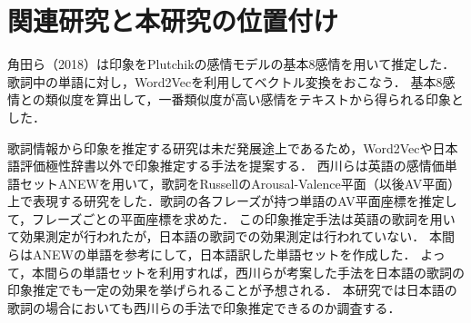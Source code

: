 \documentclass[a4paper,10pt,twocolumn]{jsarticle}
\begin{document}
\section{関連研究と本研究の位置付け}
角田ら（2018）\cite{4}は印象をPlutchikの感情モデルの基本8感情を用いて推定した．歌詞中の単語に対し，Word2Vecを利用してベクトル変換をおこなう．
基本8感情との類似度を算出して，一番類似度が高い感情をテキストから得られる印象とした．

歌詞情報から印象を推定する研究は未だ発展途上であるため，Word2Vecや日本語評価極性辞書以外で印象推定する手法を提案する．
西川ら\cite{3}は英語の感情価単語セットANEW\cite{7}を用いて，歌詞をRussellのArousal-Valence平面\cite{9}（以後AV平面）上で表現する研究をした．歌詞の各フレーズが持つ単語のAV平面座標を推定して，フレーズごとの平面座標を求めた．
この印象推定手法は英語の歌詞を用いて効果測定が行われたが，日本語の歌詞での効果測定は行われていない．
本間ら\cite{8}はANEWの単語を参考にして，日本語訳した単語セットを作成した．
よって，本間らの単語セットを利用すれば，西川らが考案した手法を日本語の歌詞の印象推定でも一定の効果を挙げられることが予想される．
本研究では日本語の歌詞の場合においても西川らの手法で印象推定できるのか調査する．
%
\end{document}
